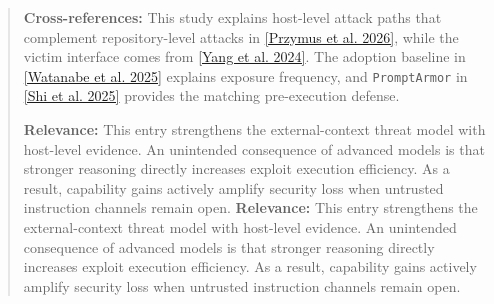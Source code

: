 \documentclass[11pt, a4paper]{article}
\begin{document}
\begin{quote}
\vspace{0.5em}
\textbf{Cross-references:} This study explains host-level attack paths that complement repository-level attacks in \hyperlink{p4}{[Przymus et al. 2026]}, while the victim interface comes from \hyperlink{p7}{[Yang et al. 2024]}. The adoption baseline in \hyperlink{p6}{[Watanabe et al. 2025]} explains exposure frequency, and \texttt{PromptArmor} in \hyperlink{p5}{[Shi et al. 2025]} provides the matching pre-execution defense.

\vspace{0.5em}
\textbf{Relevance:} This entry strengthens the external-context threat model with host-level evidence. An unintended consequence of advanced models is that stronger reasoning directly increases exploit execution efficiency. As a result, capability gains actively amplify security loss when untrusted instruction channels remain open.
\textbf{Relevance:} This entry strengthens the external-context threat model with host-level evidence. An unintended consequence of advanced models is that stronger reasoning directly increases exploit execution efficiency. As a result, capability gains actively amplify security loss when untrusted instruction channels remain open.
\end{quote}
\end{document}
